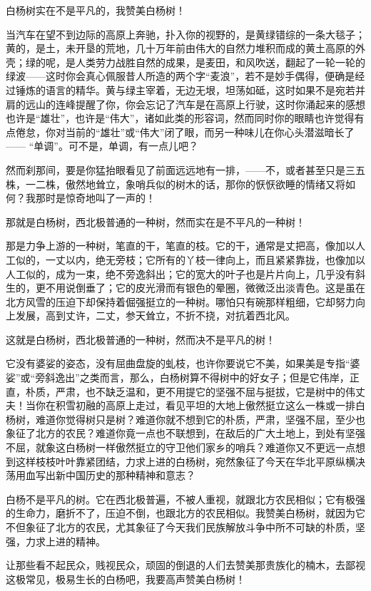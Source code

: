 \documentclass[12pt,UTF-8,openany]{ctexbook}
\begin{document}
\begin{large}
    
    白杨树实在不是平凡的，我赞美白杨树！
    
    当汽车在望不到边际的高原上奔驰，扑入你的视野的，是黄绿错综的一条大毯子；黄的，是土，未开垦的荒地，几十万年前由伟大的自然力堆积而成的黄土高原的外壳；绿的呢，是人类劳力战胜自然的成果，是麦田，和风吹送，翻起了一轮一轮的绿波——这时你会真心佩服昔人所造的两个字“麦浪”，若不是妙手偶得，便确是经过锤炼的语言的精华。黄与绿主宰着，无边无垠，坦荡如砥，这时如果不是宛若并肩的远山的连峰提醒了你，你会忘记了汽车是在高原上行驶，这时你涌起来的感想也许是“雄壮”，也许是“伟大”，诸如此类的形容词，然而同时你的眼睛也许觉得有点倦怠，你对当前的“雄壮”或“伟大”闭了眼，而另一种味儿在你心头潜滋暗长了—— “单调”。可不是，单调，有一点儿吧？
    
    然而刹那间，要是你猛抬眼看见了前面远远地有一排，——不，或者甚至只是三五株，一二株，傲然地耸立，象哨兵似的树木的话，那你的恹恹欲睡的情绪又将如何？我那时是惊奇地叫了一声的！
    
    那就是白杨树，西北极普通的一种树，然而实在是不平凡的一种树！
    
    那是力争上游的一种树，笔直的干，笔直的枝。它的干，通常是丈把高，像加以人工似的，一丈以内，绝无旁枝；它所有的丫枝一律向上，而且紧紧靠拢，也像加以人工似的，成为一束，绝不旁逸斜出；它的宽大的叶子也是片片向上，几乎没有斜生的，更不用说倒垂了；它的皮光滑而有银色的晕圈，微微泛出淡青色。这是虽在北方风雪的压迫下却保持着倔强挺立的一种树。哪怕只有碗那样粗细，它却努力向上发展，高到丈许，二丈，参天耸立，不折不挠，对抗着西北风。
    
    这就是白杨树，西北极普通的一种树，然而决不是平凡的树！
    
    它没有婆娑的姿态，没有屈曲盘旋的虬枝，也许你要说它不美，如果美是专指“婆娑”或“旁斜逸出”之类而言，那么，白杨树算不得树中的好女子；但是它伟岸，正直，朴质，严肃，也不缺乏温和，更不用提它的坚强不屈与挺拔，它是树中的伟丈夫！当你在积雪初融的高原上走过，看见平坦的大地上傲然挺立这么一株或一排白杨树，难道你觉得树只是树？难道你就不想到它的朴质，严肃，坚强不屈，至少也象征了北方的农民？难道你竟一点也不联想到，在敌后的广大土地上，到处有坚强不屈，就象这白杨树一样傲然挺立的守卫他们家乡的哨兵？难道你又不更远一点想到这样枝枝叶叶靠紧团结，力求上进的白杨树，宛然象征了今天在华北平原纵横决荡用血写出新中国历史的那种精神和意志？
    
    白杨不是平凡的树。它在西北极普遍，不被人重视，就跟北方农民相似；它有极强的生命力，磨折不了，压迫不倒，也跟北方的农民相似。我赞美白杨树，就因为它不但象征了北方的农民，尤其象征了今天我们民族解放斗争中所不可缺的朴质，坚强，力求上进的精神。
    
    让那些看不起民众，贱视民众，顽固的倒退的人们去赞美那贵族化的楠木，去鄙视这极常见，极易生长的白杨吧，我要高声赞美白杨树！
    
\end{large}
\end{document}

